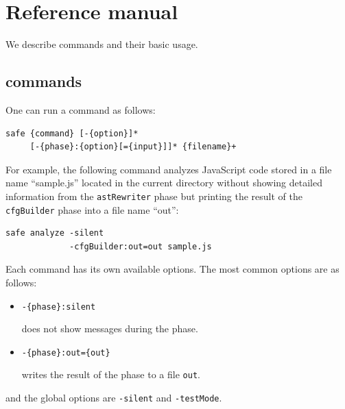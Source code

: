 \chapter{Reference manual}
\label{c:3:refman}

We describe \safe commands and their basic usage.

\section{\safe commands}
One can run a \safe command as follows:
\begin{verbatim}
safe {command} [-{option}]*
     [-{phase}:{option}[={input}]]* {filename}+
\end{verbatim}
For example, the following command analyzes JavaScript code stored in a file name
``{sample.js}'' located in the current directory without showing detailed information
from the \verb!astRewriter! phase but printing the result of the \verb!cfgBuilder!
phase into a file name ``{out}'':
\begin{verbatim}
safe analyze -silent
             -cfgBuilder:out=out sample.js
\end{verbatim}

Each command has its own available options.  The most common options are as follows:
\begin{itemize}
\item \verb!-{phase}:silent!

\safe does not show messages during the phase.

\item \verb!-{phase}:out={out}!

\safe writes the result of the phase to a file \verb!out!.
\end{itemize}
and the global options are \verb!-silent! and \verb!-testMode!.

